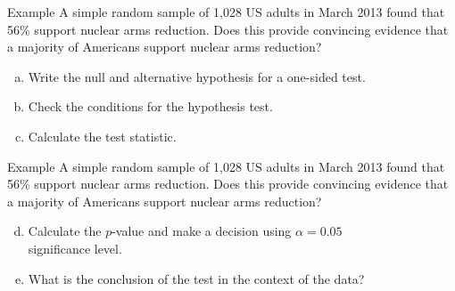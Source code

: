 \documentclass[fleqn, 11pt]{beamer}
\begin{document}
\begin{frame}{Example} %
\small
A simple random sample of 1,028 US adults in March 2013 found that 56\% support nuclear arms reduction. Does this provide convincing evidence that a majority of Americans support nuclear arms reduction?
\begin{enumerate}[(a)]
\item Write the null and alternative hypothesis for a one-sided test.\\
\vspace{1.5cm}
\item Check the conditions for the hypothesis test.
\vspace{1.5cm}
\item Calculate the test statistic.\\
\vspace{2cm}
\end{enumerate}
\end{frame}

\begin{frame}{Example} %
\small
A simple random sample of 1,028 US adults in March 2013 found that 56\% support nuclear arms reduction. Does this provide convincing evidence that a majority of Americans support nuclear arms reduction?
\begin{enumerate}[(a)]
\setcounter{enumi}{3}
\item Calculate the $p$-value and make a decision using $\alpha = 0.05$\\ significance level.
\vspace{2.25cm}
\item What is the conclusion of the test in the context of the data?\\
\vspace{2.25cm}
\end{enumerate}
\end{frame}

\end{document}
